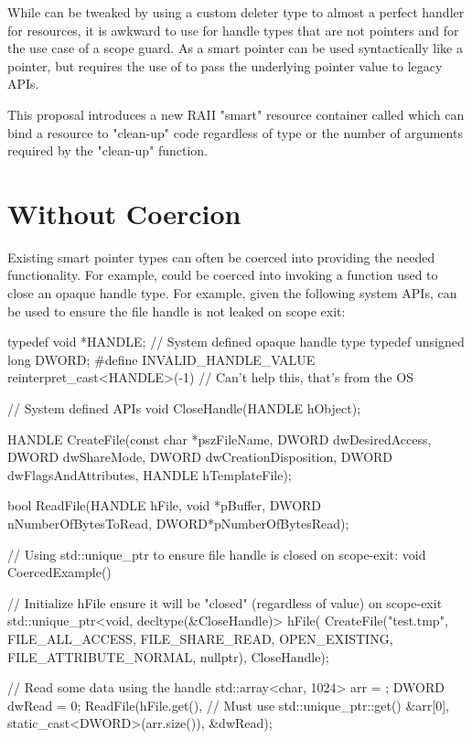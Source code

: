 \documentclass[ebook,11pt,article]{memoir}
\begin{document}
While  can be tweaked by using a custom deleter type to almost a perfect handler for resources, it is awkward to use for handle types that are not pointers and for the use case of a scope guard. As a smart pointer   can be used syntactically like a pointer, but requires the use of  to pass the underlying pointer value to legacy APIs.

This proposal introduces a new RAII "smart" resource container called  which can bind a resource to "clean-up" code regardless of type or the number of arguments required by the "clean-up" function.

\section {Without Coercion}
Existing smart pointer types can often be coerced into providing the needed functionality.  For example,  could be coerced into invoking a function used to close an opaque handle type.  For example, given the following system APIs,  can be used to ensure the file handle is not leaked on scope exit:

\begin{codeblock}
typedef void *HANDLE;        // System defined opaque handle type
typedef unsigned long DWORD;
#define INVALID_HANDLE_VALUE reinterpret_cast<HANDLE>(-1)	
// Can't help this, that's from the OS

// System defined APIs
void CloseHandle(HANDLE hObject);

HANDLE CreateFile(const char *pszFileName, 
	DWORD dwDesiredAccess, 
	DWORD dwShareMode, 
	DWORD dwCreationDisposition, 
	DWORD dwFlagsAndAttributes, 
	HANDLE hTemplateFile);

bool ReadFile(HANDLE hFile, 
	void *pBuffer, 
	DWORD nNumberOfBytesToRead, 
	DWORD*pNumberOfBytesRead);

// Using std::unique_ptr to ensure file handle is closed on scope-exit:
void CoercedExample()
{
	// Initialize hFile ensure it will be "closed" (regardless of value) on scope-exit
	std::unique_ptr<void, decltype(&CloseHandle)> hFile(
		CreateFile("test.tmp", 
			FILE_ALL_ACCESS, 
			FILE_SHARE_READ, 
			OPEN_EXISTING, 
			FILE_ATTRIBUTE_NORMAL,
			nullptr), 
		CloseHandle);

	// Read some data using the handle
	std::array<char, 1024> arr = { };
	DWORD dwRead = 0;
	ReadFile(hFile.get(),	// Must use std::unique_ptr::get()
		&arr[0], 
		static_cast<DWORD>(arr.size()), 
		&dwRead);
}
\end{codeblock}
\end{document}
